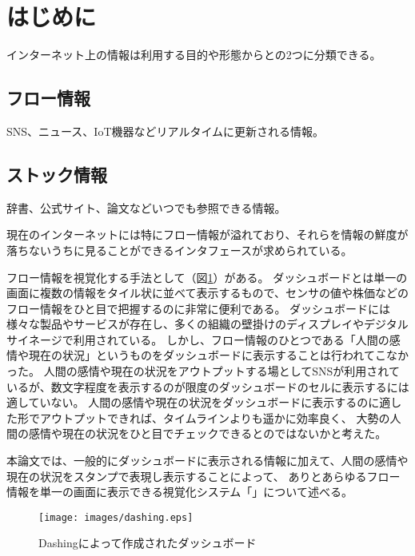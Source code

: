 \section{はじめに}

インターネット上の情報は利用する目的や形態からとの2つに分類できる。

\subsection*{フロー情報}

SNS、ニュース、IoT機器などリアルタイムに更新される情報。

\subsection*{ストック情報}

辞書、公式サイト、論文などいつでも参照できる情報。\vspace{0.2in}

現在のインターネットには特にフロー情報が溢れており、それらを情報の鮮度が落ちないうちに見ることができるインタフェースが求められている。

フロー情報を視覚化する手法として（図\ref{dashing}）がある。
ダッシュボードとは単一の画面に複数の情報をタイル状に並べて表示するもの\cite{few2005}で、センサの値や株価などのフロー情報をひと目で把握するのに非常に便利である。
ダッシュボードには様々な製品やサービスが存在し、多くの組織の壁掛けのディスプレイやデジタルサイネージで利用されている。
しかし、フロー情報のひとつである「人間の感情や現在の状況」というものをダッシュボードに表示することは行われてこなかった。
人間の感情や現在の状況をアウトプットする場としてSNSが利用されているが、数文字程度を表示するのが限度のダッシュボードのセルに表示するには適していない。
人間の感情や現在の状況をダッシュボードに表示するのに適した形でアウトプットできれば、タイムラインよりも遥かに効率良く、
大勢の人間の感情や現在の状況をひと目でチェックできるとのではないかと考えた。

本論文では、一般的にダッシュボードに表示される情報に加えて、人間の感情や現在の状況をスタンプで表現し表示することによって、
ありとあらゆるフロー情報を単一の画面に表示できる視覚化システム「」について述べる。

\begin{figure}[h]
\centering
\texttt{[image: images/dashing.eps]}
\caption{Dashingによって作成されたダッシュボード}
\label{dashing}
\end{figure}